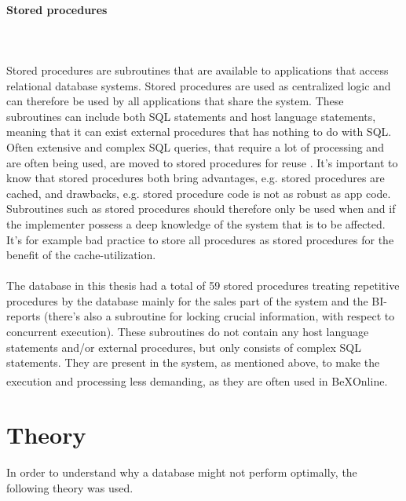 \documentclass{cslthse-msc}
\newcommand{\bex}{BeX\textsuperscript{\textregistered}}
\begin{document}
\paragraph*{Stored procedures}\mbox{}\\\\ 
Stored procedures are subroutines that are available to applications that access relational database systems. Stored procedures are used as centralized logic and can therefore be used by all applications that share the system. These subroutines can include both SQL statements and host language statements, meaning that it can exist external procedures that has nothing to do with SQL. Often extensive and complex SQL queries, that require a lot of processing and are often being used, are moved to stored procedures for reuse   \cite{StoredProcedures}. It's important to know that stored procedures both bring advantages, e.g. stored procedures are cached, and drawbacks, e.g. stored procedure code is not as robust as app code. Subroutines such as stored procedures should therefore only be used when and if the implementer possess a deep knowledge of the system that is to be affected. It's for example bad practice to store all procedures as stored procedures for the benefit of the cache-utilization.\\\\
The database in this thesis had a total of 59 stored procedures treating repetitive procedures by the database mainly for the sales part of the system and the BI-reports (there's also a subroutine for locking crucial information, with respect to concurrent execution). These subroutines do not contain any host language statements and/or external procedures, but only consists of complex SQL statements. They are present in the system, as mentioned above, to make the execution and processing less demanding, as they are often used in \bex Online.

 
\section{Theory}\label{sec:theory}
In order to understand why a database might not perform optimally, the following theory was used.
\end{document}
